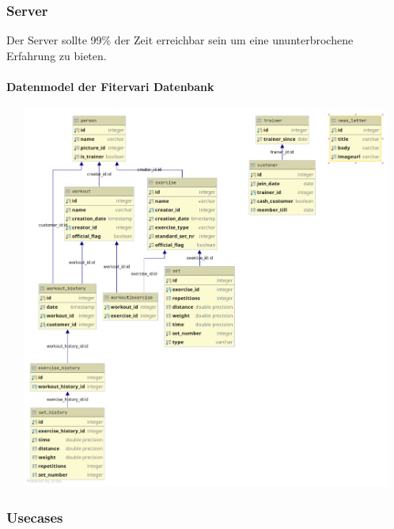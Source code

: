 \documentclass[12pt]{article}
\theoremstyle{definition}
\begin{document}
\subsubsection{Server}
Der Server sollte 99\% der Zeit erreichbar sein um eine ununterbrochene Erfahrung zu bieten.\\
\paragraph{Datenmodel der Fitervari Datenbank}
\begin{center}

\includegraphics[width=15cm, height=12.6cm]{datenmodel.png}

\end{center}
\pagebreak

\subsubsection{Usecases}
\end{document}
